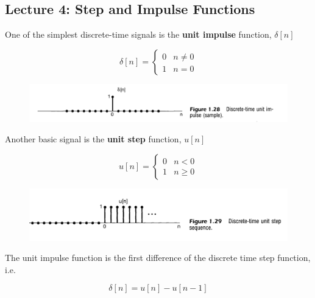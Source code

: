\documentclass[10pt]{article}
\begin{document}
\subsection{Lecture 4: Step and Impulse Functions}

One of the simplest discrete-time signals is the \textbf{unit impulse} function, $ \delta[n] $ 


\begin{definition}
\begin{equation}
	\delta[n] = \begin{cases}
		0 & n \neq 0 \\
		1 & n = 0
	\end{cases}
	\label{eq:355:unit_impulse}
\end{equation}


\begin{figure}[H]
	\centering
	\includegraphics[width=0.8\linewidth]{img/image_2022-09-16-14-12-45.png}
\end{figure}
\end{definition}


Another basic signal is the \textbf{unit step} function, $ u[n] $

\begin{definition}
	
\begin{equation}
	u[n] = \begin{cases}
		0 & n < 0 \\
		1 & n \geq 0
	\end{cases}
\end{equation}
\begin{figure}[H]
	\centering
	\includegraphics[width=0.8\linewidth]{img/image_2022-09-16-14-13-03.png}
\end{figure}
\end{definition}


The unit impulse function is the first difference of the discrete time step function, i.e.

\begin{equation}
	\delta[n] = u[n] - u[n-1]
\end{equation}
\end{document}

